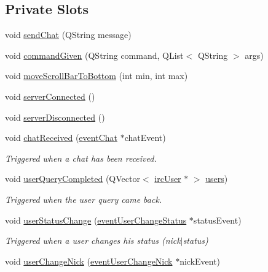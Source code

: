 \subsection*{Private Slots}
\begin{DoxyCompactItemize}
\item 
void \hyperlink{classclient_1_1_main_window_aa32adfb179341040f2decbd0da19f1d9}{send\-Chat} (Q\-String message)
\item 
void \hyperlink{classclient_1_1_main_window_a75d241698eb127c089ed4703fbeb4999}{command\-Given} (Q\-String command, Q\-List$<$ Q\-String $>$ args)
\item 
void \hyperlink{classclient_1_1_main_window_a0c9982277db418807d2611e80cb65983}{move\-Scroll\-Bar\-To\-Bottom} (int min, int max)
\item 
void \hyperlink{classclient_1_1_main_window_aae9222490d9f0d71ffa6585c35416bfb}{server\-Connected} ()
\item 
void \hyperlink{classclient_1_1_main_window_a1453a7da1874881b67aa919390012e36}{server\-Disconnected} ()
\item 
void \hyperlink{classclient_1_1_main_window_a51e1634c12eb7373b01dce36a03afc9a}{chat\-Received} (\hyperlink{classshared_1_1events_1_1event_chat}{event\-Chat} $\ast$chat\-Event)
\begin{DoxyCompactList}\small\item\em Triggered when a chat has been received. \end{DoxyCompactList}\item 
void \hyperlink{classclient_1_1_main_window_a13044cd00c53dbbbc6b945c0dfd9b4b4}{user\-Query\-Completed} (Q\-Vector$<$ \hyperlink{classclient_1_1irc_user}{irc\-User} $\ast$ $>$ \hyperlink{classclient_1_1_main_window_a1b6893fbe6201f0ab9d6e94695834bb5}{users})
\begin{DoxyCompactList}\small\item\em Triggered when the user query came back. \end{DoxyCompactList}\item 
void \hyperlink{classclient_1_1_main_window_a380097fa1faba7f0457886053f793c59}{user\-Status\-Change} (\hyperlink{classshared_1_1events_1_1event_user_change_status}{event\-User\-Change\-Status} $\ast$status\-Event)
\begin{DoxyCompactList}\small\item\em Triggered when a user changes his status (nick$|$status) \end{DoxyCompactList}\item 
void \hyperlink{classclient_1_1_main_window_ae966f5228762e7b6f4803127d087175d}{user\-Change\-Nick} (\hyperlink{classshared_1_1events_1_1event_user_change_nick}{event\-User\-Change\-Nick} $\ast$nick\-Event)

\end{DoxyCompactItemize}
